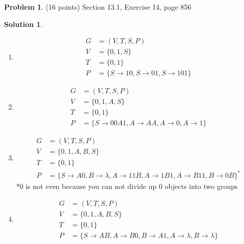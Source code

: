 \documentclass{article}
\theoremstyle{definition}
\newtheorem{problem}{Problem}
\newtheorem*{solution}{Solution}
\begin{document}
\begin{problem} (16 points)
Section 13.1, Exercise 14, page 856
\end{problem}
\begin{solution} \ \\
  \begin{enumerate}
    \item
    \begin{align*}
      G &= (V,T,S,P) \\
      V &= \{0,1,S\} \\
      T &= \{0,1\} \\
      P &= \{S \rightarrow 10, S \rightarrow 01, S \rightarrow 101\}
    \end{align*}
    \item
    \begin{align*}
      G &= (V,T,S,P) \\
      V &= \{0,1,A,S\} \\
      T &= \{0,1\} \\
      P &= \{S \rightarrow 00A1, A \rightarrow AA, A \rightarrow 0, A \rightarrow 1 \}
    \end{align*}
    \item
    \begin{align*}
      G &= (V,T,S,P) \\
      V &= \{0,1,A,B,S\} \\
      T &= \{0,1\} \\
      P &= \{S \rightarrow A0, B \rightarrow \lambda, A \rightarrow 11B, A \rightarrow 1B1, A \rightarrow B11, B \rightarrow 0B \}^*
    \end{align*}
    *0 is not even because you can not divide up 0 objects into two groups
    \item
    \begin{align*}
      G &= (V,T,S,P) \\
      V &= \{0,1,A,B,S\} \\
      T &= \{0,1\} \\
      P &= \{S \rightarrow AB, A \rightarrow B0, B \rightarrow A1, A \rightarrow \lambda, B \rightarrow \lambda\}
    \end{align*}
  \end{enumerate}
\end{solution}
\end{document}
